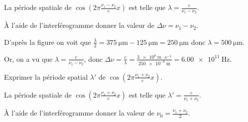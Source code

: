 	
	\begin{corrige}
		La période spatiale de $\cos\left( 2\pi\frac{\nu_1 - \nu_2}{c}x \right)$ est telle que $
		\lambda = \frac{c}{\nu_1 - \nu_2}$.
	\end{corrige}
	


\begin{enonce}
	À l'aide de l'interférogramme donner la valeur de $\Delta \nu = \nu_1 - \nu_2$.
\end{enonce}
	
	
	\begin{corrige}
		D'après la figure on voit que $\frac{\lambda}{2} = \SI{375}{\micro\meter} - \SI{125}{\micro\meter} = \SI{250}{\micro\meter}$ donc $\lambda = \SI{500}{\micro\meter}$.

		Or, on a vu que $\lambda = \frac{c}{\nu_1 - \nu_2}$, donc 
		$
		\Delta \nu = \frac{c}{\lambda} = \frac{\SI{3e8}{m \cdot s^{-1} }}{ \SI{250e-6}{\meter} } = \SI{6.00e11}{\hertz}
		$.
	\end{corrige}
	



\begin{enonce}
	Exprimer la période spatial $\lambda'$ de $\cos\left( 2\pi\frac{\nu_1 + \nu_2}{c}x \right)$.
\end{enonce}
	
	
	\begin{corrige}
		La période spatiale de $\cos\left( 2\pi\frac{\nu_1 + \nu_2}{c}x \right)$ est telle que $
		\lambda' = \frac{c}{\nu_1 + \nu_2}$.
	\end{corrige}
	



\begin{enonce}
	À l'aide de l'interférogramme donner la valeur de $\nu_0 = \frac{\nu_1 + \nu_2}{2}$.
\end{enonce}
	
